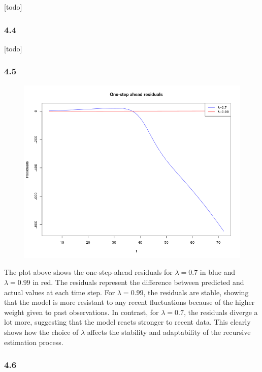\documentclass[
]{article}
\begin{document}
{[}todo{]}

\subsubsection{4.4}\label{section-16}

{[}todo{]}

\subsubsection{4.5}\label{section-17}

\begin{figure}

{\centering \includegraphics[width=0.5\linewidth]{plots/one_step_ahead_pred} 

}

\end{figure}

The plot above shows the one-step-ahead residuals for \(\lambda = 0.7\)
in blue and \(\lambda = 0.99\) in red. The residuals represent the
difference between predicted and actual values at each time step. For
\(\lambda = 0.99\), the residuals are stable, showing that the model is
more resistant to any recent fluctuations because of the higher weight
given to past observations. In contrast, for \(\lambda = 0.7\), the
residuals diverge a lot more, suggesting that the model reacts stronger
to recent data. This clearly shows how the choice of \(\lambda\) affects
the stability and adaptability of the recursive estimation process.

\subsubsection{4.6}\label{section-18}
\end{document}
